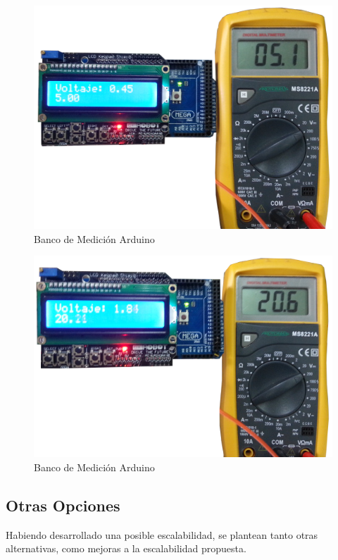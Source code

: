 \documentclass[12pt,a4paper]{article}
\begin{document}
			\begin{figure}[H]
			\centering
				\includegraphics[scale=0.7]{images/arduino5.png}\caption{Banco de Medición Arduino}
			\end{figure}

			\begin{figure}[H]
			\centering
				\includegraphics[scale=0.7]{images/arduino6.png}\caption{Banco de Medición Arduino}
			\end{figure}

		\subsection{Otras Opciones}

			Habiendo desarrollado una posible escalabilidad, se plantean tanto otras alternativas, como mejoras a la escalabilidad propuesta.
\end{document}
